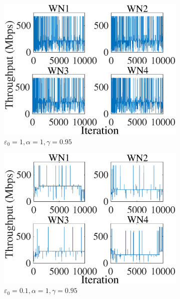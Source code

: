 \documentclass[conference]{IEEEtran}
\begin{document}
	\begin{figure}[]
		\centering
		\begin{subfigure}[b]{0.225\textwidth}
			\includegraphics[width=\textwidth]{images/e_1_a1_g095_ind_tpt}
			\caption{$\varepsilon_0=1, \alpha=1, \gamma=0.95$}
			\label{fig:e_1_a1_g095_ind_tpt}
		\end{subfigure}
		\begin{subfigure}[b]{0.225\textwidth}
			\includegraphics[width=\textwidth]{images/e_01_a_1_g_095_ind_tpt}
			\caption{$\varepsilon_0=0.1, \alpha=1, \gamma=0.95$}
			\label{fig:e_1_a_1_g_095_ind_tpt}
		\end{subfigure}
		\begin{subfigure}[b]{0.225\textwidth}

\end{subfigure}
\end{figure}
\end{document}
